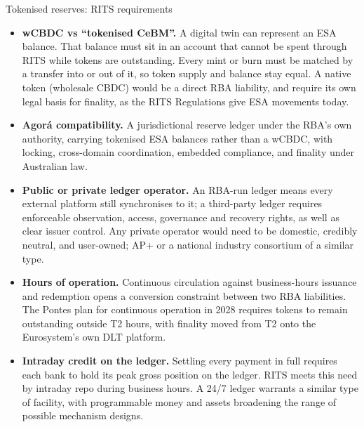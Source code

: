 \documentclass[aspectratio=169,12pt]{beamer}
\makeatletter
\newcommand{\rust}[1]{{\color{Rust}\bfseries\fontsize{\dimexpr\f@size pt+0.7pt\relax}{\f@baselineskip}\selectfont #1}}
\makeatother
\begin{document}
\begin{frame}[t]{Tokenised reserves: RITS requirements}
\fontsize{8.0}{10.0}\selectfont
\vspace{-0.1em}
  \vspace{0pt plus 0.35fill}\begin{itemize}\setlength{\itemsep}{2pt plus 2.4fill}
    \item \rust{wCBDC vs ``tokenised CeBM''.} A digital twin can represent an ESA balance. That balance must sit in an account that cannot be spent through RITS while tokens are outstanding. Every mint or burn must be matched by a transfer into or out of it, so token supply and balance stay equal. A native token (wholesale CBDC) would be a direct RBA liability, and require its own legal basis for finality, as the RITS Regulations give ESA movements today.
    \item \rust{Agor\'a compatibility.} A jurisdictional reserve ledger under the RBA's own authority, carrying tokenised ESA balances rather than a wCBDC, with locking, cross-domain coordination, embedded compliance, and finality under Australian law.
    \item \rust{Public or private ledger operator.} An RBA-run ledger means every external platform still synchronises to it; a third-party ledger requires enforceable observation, access, governance and recovery rights, as well as clear issuer control. Any private operator would need to be domestic, credibly neutral, and user-owned; AP+ or a national industry consortium of a similar type.
    \item \rust{Hours of operation.} Continuous circulation against business-hours issuance and redemption opens a conversion constraint between two RBA liabilities. The Pontes plan for continuous operation in 2028 requires tokens to remain outstanding outside T2 hours, with finality moved from T2 onto the Eurosystem's own DLT platform.
    \item \rust{Intraday credit on the ledger.} Settling every payment in full requires each bank to hold its peak gross position on the ledger. RITS meets this need by intraday repo during business hours. A 24/7 ledger warrants a similar type of facility, with programmable money and assets broadening the range of possible mechanism designs.
  \end{itemize}\vspace{0pt plus 4fill}
\end{frame}
\fi
\end{document}
